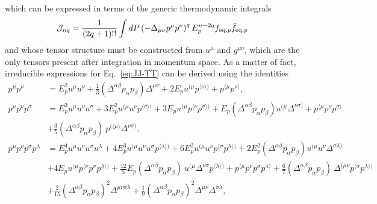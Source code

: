 \documentclass[aps,prd,preprint,nofootinbib,amsmath,amssymb,showpacs,longbibliography,singlecolumn,superscriptaddress,10pt]{revtex4-1}
\theoremstyle{plain}
\theoremstyle{definition}
\begin{document}
%
which can be expressed in terms of the generic thermodynamic integrals
%
\begin{equation}
\begin{aligned}
&
\mathcal{J}_{nq} = \frac{1}{(2q+1)!!} \int dP \left( - \Delta_{\mu \nu} p^{\mu} p^{\nu} \right)^{q} E_{p}^{n-2q} f_{\text{eq},p} \Tilde{f}_{\text{eq},p} 
\end{aligned}    
\end{equation}
%
and whose tensor structure must be constructed from $u^{\mu}$ and $g^{\mu \nu}$, which are the only tensors present after integration in momentum space. As a matter of fact, irreducible expressions for Eq.~\eqref{eq:JJ-TT} can be derived using the identities
%
\begin{equation}
\begin{aligned}
p^{\mu} p^{\nu} &= E_p^{2} u^{\mu} u^{\nu} 
+
\frac{1}{3} \left(\Delta^{\alpha \beta} p_{\alpha} p_{\beta} \right)
\Delta^{\mu \nu}
+
2 E_p u^{(\mu} p^{\langle \nu \rangle)}
+
p^{\langle \mu} p^{\nu \rangle},
\\
p^\mu p^\nu p^\sigma & = E_p^{3} u^{\mu} u^{\nu} u^{\sigma}
+
3 E_p^{2} u^{(\mu} u^{\nu} p^{\langle \sigma \rangle)}
+
3 E_p u^{(\mu} p^{\langle \nu} p^{\sigma \rangle)}
+ 
 E_p  \left(\Delta^{\alpha \beta} p_{\alpha} p_{\beta} \right) u^{(\mu} \Delta^{\nu \sigma )}
+
p^{\langle \mu} p^\nu p^{\sigma \rangle}
\\
&
+
\frac{3}{5}  \left(\Delta^{\alpha \beta} p_{\alpha} p_{\beta} \right) \
p^{( \langle \mu \rangle} \Delta^{\nu \sigma )},
\\
p^\mu p^\nu p^\sigma p^{\lambda} 
& 
=
E_p^{4} u^{\mu} u^{\nu} u^{\sigma} u^{\lambda}
+
4 E_p^{3} u^{(\mu} u^{\nu} u^{\sigma} p^{\langle \lambda \rangle)}
+
6 E_p^{2} u^{(\mu} u^{\nu} p^{\langle \sigma} p^{\lambda \rangle)}
+
2 E_p^{2} \left(\Delta^{\alpha \beta} p_{\alpha} p_{\beta} \right) u^{(\mu} u^{\nu} \Delta^{\sigma \lambda)}
\\
&
+
4 E_p u^{(\mu} p^{\langle \nu} p^\sigma p^{\lambda \rangle )}
+
\frac{12}{5} E_p  \left(\Delta^{\alpha \beta} p_{\alpha} p_{\beta} \right)
\ u^{(\mu} \Delta^{\nu \sigma} p^{\langle \lambda \rangle )}
+
p^{\langle \mu} p^\nu p^\sigma p^{\lambda \rangle}
+
\frac{6}{7}
\left(\Delta^{\alpha \beta} p_{\alpha} p_{\beta} \right) \ 
\Delta^{(\mu \nu} p^{\langle \sigma } p^{ \lambda \rangle)}
\\
&
+ 
\frac{2}{15} \left( \Delta^{\alpha \beta} p_{\alpha} p_{\beta} \right)^{2} \Delta^{\mu \nu \sigma \lambda} 
+ 
\frac{1}{9}\left( \Delta^{\alpha \beta} p_{\alpha} p_{\beta} \right)^{2} \Delta^{\mu \nu} \Delta^{\sigma \lambda},
\end{aligned}    
\end{equation}
\end{document}
